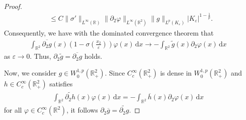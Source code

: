 \documentclass[10pt]{amsart}
\theoremstyle{definition}
\theoremstyle{remark}
\numberwithin{equation}{section}
\newcommand{\ud}{\mathrm{d}}
\newcommand{\rd}{\partial}
\newcommand{\0}{\emptyset}
\newcommand{\bbR}{\mathbb R}
\begin{document}
\begin{proof}
\begin{equation}
\begin{aligned}
				&\leq C\| \sigma' \|_{L^{\infty}(\bbR)} \| \rd_{2} \varphi \|_{L^{\infty}(\bbR^2)} \| g \|_{L^p(K_{\varepsilon})} |K_{\varepsilon}|^{1-\frac{1}{p}}.
			\end{aligned}
		\end{equation} Consequently, we have with the dominated convergence theorem that \begin{equation*}
			\begin{aligned}
				\int_{\bbR^2} \overline{\partial_2 g}(x) (1-\sigma(\frac{x_2}{\varepsilon})) \varphi(x) \,\ud x \to -\int_{\bbR^2} \widetilde{g}(x) \partial_2 \varphi(x) \,\ud x
			\end{aligned}
		\end{equation*} as $\varepsilon \to 0$. Thus, $\rd_{2} \widetilde{g} = \overline{\rd_{2}g}$ holds.
		
		Now, we consider $g \in W^{1,p}_{0}(\bbR^{2}_{+})$. Since $C^{\infty}_c(\bbR^2_{+})$ is dense in $W^{1,p}_{0}(\bbR^2_{+})$ and $h \in C^{\infty}_c(\bbR^2_{+})$ satisfies \begin{equation*}
			\begin{aligned}
				\int_{\bbR^2} \widetilde{\partial_2 h}(x) \varphi(x) \,\ud x = - \int_{\bbR^2} \overline{h}(x) \partial_2 \varphi(x) \,\ud x
			\end{aligned}
		\end{equation*} for all $\varphi \in C^{\infty}_c(\bbR^2)$, it follows $\partial_2 \overline{g} = \widetilde{\partial_2 g}$.

\end{proof}
\end{document}
